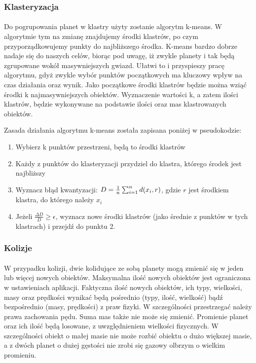 \subsubsection{Klasteryzacja}

\paragraph{}

Do pogrupowania planet w klastry użyty zostanie algorytm k-means. W algorytmie tym na zmianę znajdujemy środki klastrów, po czym przyporządkowujemy punkty do najbliższego środka. K-means bardzo dobrze nadaje się do naszych celów, biorąc pod uwagę, iż zwykle planety i tak będą zgrupowane wokół masywniejszych gwiazd. Ułatwi to i przyspieszy pracę algorytmu, gdyż zwykle wybór punktów początkowych ma kluczowy wpływ na czas działania oraz wynik. Jako początkowe środki klastrów będzie można wziąć środki k najmasywniejszych obiektów. Wyznaczenie wartości k, a zatem ilości klastrów, będzie wykonywane na podstawie ilości oraz mas klastrowanych obiektów.

Zasada działania algorytmu k-means została zapisana poniżej w pseudokodzie:

\begin{enumerate}
	\item{Wybierz k punktów przestrzeni, będą to środki klastrów}
	\item{Każdy z punktów do klasteryzacji przydziel do klastra, którego środek jest najbliższy}
	\item{Wyznacz błąd kwantyzacji: \ensuremath{D = {1\over{n}}\sum_{i = 1}^{n}d(x_i, r)}, gdzie \ensuremath{r} jest środkiem klastra, do którego należy \ensuremath{x_i} }
	\item{Jeżeli \ensuremath{\frac{\Delta{D}}{D}\geqslant\epsilon}, wyznacz nowe środki klastrów (jako średnie z punktów w tych klastrach) i przejdź do punktu 2.}
\end{enumerate}

\subsubsection{Kolizje}

\paragraph{}

W przypadku kolizji, dwie kolidujące ze sobą planety mogą zmienić się w jeden lub więcej nowych obiektów. Maksymalna ilość nowych obiektów jest ograniczona w ustawieniach aplikacji. Faktyczna ilość nowych obiektów, ich typy, wielkości, masy oraz prędkości wynikać będą pośrednio (typy, ilość, wielkość) bądź bezpośrednio (masy, prędkości) z praw fizyki. W szczególności przestrzegać należy prawa zachowania pędu. Suma mas także nie może się zmienić. Promienie planet oraz ich ilość będą losowane, z uwzględnieniem wielkości fizycznych. W szczególności obiekt o małej masie nie może rozbić obiektu o dużo większej masie, a z dwóch planet o dużej gęstości nie zrobi się gazowy olbrzym o wielkim promieniu.

